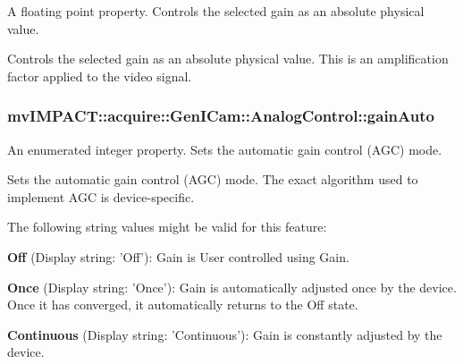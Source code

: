 A floating point property. Controls the selected gain as an absolute physical value. 

Controls the selected gain as an absolute physical value. This is an amplification factor applied to the video signal. \hypertarget{classmv_i_m_p_a_c_t_1_1acquire_1_1_gen_i_cam_1_1_analog_control_a2ba45ff2973f5d1f3817fdb237d1de3e}{
\subsubsection[{gain\+Auto}]{ mv\+I\+M\+P\+A\+C\+T\+::acquire\+::\+Gen\+I\+Cam\+::\+Analog\+Control\+::gain\+Auto}}\label{classmv_i_m_p_a_c_t_1_1acquire_1_1_gen_i_cam_1_1_analog_control_a2ba45ff2973f5d1f3817fdb237d1de3e}


An enumerated integer property. Sets the automatic gain control (A\+G\+C) mode. 

Sets the automatic gain control (A\+G\+C) mode. The exact algorithm used to implement A\+G\+C is device-\/specific.

The following string values might be valid for this feature\+:
\begin{DoxyItemize}
\item {\bfseries Off} (Display string\+: 'Off')\+: Gain is User controlled using Gain.
\item {\bfseries Once} (Display string\+: 'Once')\+: Gain is automatically adjusted once by the device. Once it has converged, it automatically returns to the Off state.
\item {\bfseries Continuous} (Display string\+: 'Continuous')\+: Gain is constantly adjusted by the device.
\end{DoxyItemize}

